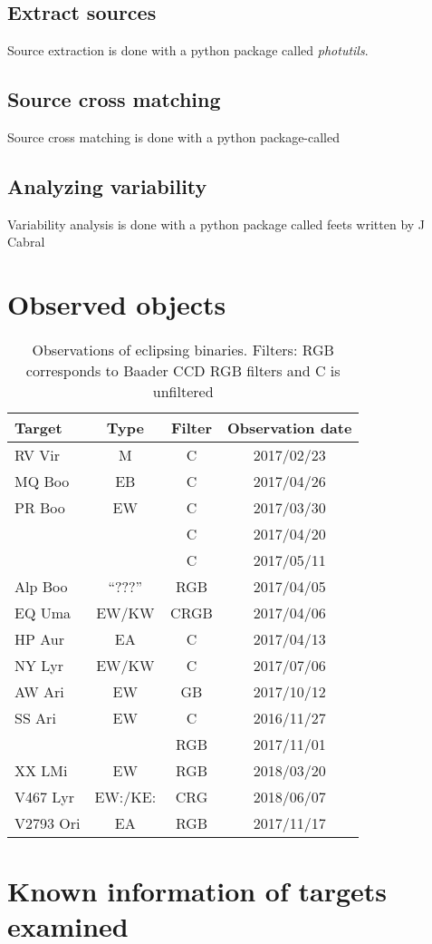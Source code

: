 \subsection{Extract sources}
Source extraction is done with a python package called \textit{photutils}.

\subsection{Source cross matching}
Source cross matching is done with a python package-called 

\subsection{Analyzing variability}
Variability analysis is done with a python package called feets written by J Cabral~\cite{cabral_2018}


\section{Observed objects}
\begin{table}
    \centering
    \begin{tabular}[h]{l c c c}
    \toprule
    Target      & Type  & Filter    & Observation date \\ \bottomrule
    RV Vir      & M     & C         & 2017/02/23 \\ \midrule
    MQ Boo      & EB    & C         & 2017/04/26 \\ \midrule
    PR Boo      & EW    & C         & 2017/03/30 \\ \midrule
                &       & C         & 2017/04/20 \\ \midrule
                &       & C         & 2017/05/11 \\ \midrule
    Alp Boo     & ``???''   & RGB       & 2017/04/05 \\ \midrule
    EQ Uma      & EW/KW & CRGB      & 2017/04/06 \\ \midrule
    HP Aur      & EA    & C         & 2017/04/13 \\ \midrule
    NY Lyr      & EW/KW & C         & 2017/07/06 \\ \midrule
    AW Ari      & EW    & GB        & 2017/10/12 \\ \midrule
    SS Ari      & EW    & C         & 2016/11/27 \\ \midrule
                &       & RGB       & 2017/11/01 \\ \midrule
    XX LMi      & EW    & RGB       & 2018/03/20 \\ \midrule
    V467 Lyr    & EW:/KE:& CRG   & 2018/06/07 \\ \midrule
    V2793 Ori   & EA    & RGB   & 2017/11/17 \\
    \bottomrule
    \end{tabular}
    \caption{Observations of eclipsing binaries. Filters: RGB corresponds to Baader CCD RGB filters and C is unfiltered}\label{tab:observations}
\end{table}
\section{Known information of targets examined}

